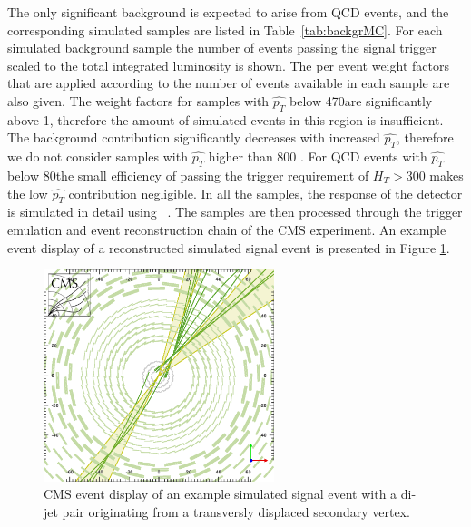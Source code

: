The only significant background is expected to arise from QCD events, and the corresponding simulated samples
are listed in Table~\ref{tab:backgrMC}.
For each simulated background sample the number of events passing the signal trigger
scaled to the total integrated luminosity is shown. The per event weight factors that are applied according to the
number of events available in each sample are also given. The weight factors for samples with $\hat{p_T}$ 
below 470\GeV are significantly above 1, therefore the amount of simulated events in this region is insufficient. 
The background contribution   
significantly decreases with increased $\hat{p_T}$, therefore we do not consider samples with $\hat{p_T}$ higher
than 800 \GeV. For QCD events with $\hat{p_T}$ below 80\GeV the small efficiency of passing the trigger
 requirement of $H_T>$300\GeV 
makes the low $\hat{p_T}$ contribution negligible.  
In all the samples, the response of the detector is simulated
in detail using \GEANTfour~\cite{GEANT4}. The samples are then processed through the trigger emulation and
event reconstruction chain of the CMS experiment. An example event display of a reconstructed 
simulated signal event is presented in Figure \ref{fig:eventDisplay}.

\begin{figure}[htbp]
\centering
 \includegraphics[width=0.6\textwidth]{plots/eventDisplay.png}
\caption{CMS event display of an example simulated signal event with a di-jet pair originating from a transversly displaced secondary vertex. \label{fig:eventDisplay}}
\end{figure}
 
